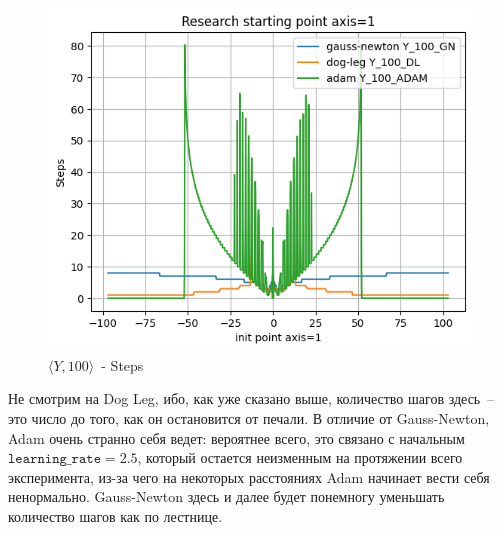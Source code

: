 \documentclass[12pt, a4paper, oneside, final]{article}
\begin{document}
	\begin{figure}[H]
		\centering
		\includegraphics[scale = 0.55]{Image/T1_Y_100_STEPS.png}
		\caption*{$\langle Y, 100 \rangle$~- Steps}
	\end{figure}
	Не смотрим на Dog Leg, ибо, как уже сказано выше, количество шагов здесь~-- это число до того, как он остановится от печали.
	В отличие от Gauss-Newton, Adam очень странно себя ведет: вероятнее всего, это связано с начальным $\mathtt{learning\_rate} = 2.5$, который остается неизменным на протяжении всего эксперимента, из-за чего на некоторых расстояниях Adam начинает вести себя ненормально.
	Gauss-Newton здесь и далее будет понемногу уменьшать количество шагов как по лестнице.
\end{document}
